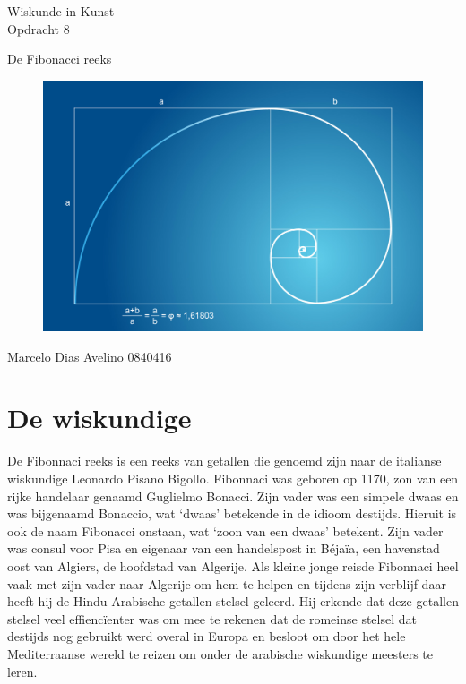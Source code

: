 \documentclass{article}
\begin{document}
\begin{center}
	\huge{Wiskunde in Kunst}\\
	\LARGE{Opdracht }8 \\
	
	\vspace{2cm}
	
	\Large{De Fibonacci reeks}\\
	
	\vfill
	
	\begin{figure}[Hh]
		\centering
		\includegraphics[width=\textwidth]{golden-ratio.jpg}
	\end{figure}
	
	\vfill
	\Large{Marcelo Dias Avelino} \hfill \large{0840416}
\end{center}

\thispagestyle{empty} %

\pagebreak

\setcounter{page}{1} %

\section{De wiskundige}

De Fibonnaci reeks is een reeks van getallen die genoemd zijn naar de italianse wiskundige Leonardo Pisano Bigollo. Fibonnaci was geboren op 1170, zon van een rijke handelaar genaamd Guglielmo Bonacci. Zijn vader was een simpele dwaas en was bijgenaamd Bonaccio, wat `dwaas' betekende in de idioom destijds. Hieruit is ook de naam Fibonacci onstaan, wat `zoon van een dwaas' betekent. Zijn vader was consul voor Pisa en eigenaar van een handelspost in B\'eja\"ia, een havenstad oost van Algiers, de hoofdstad van Algerije. Als kleine jonge reisde Fibonnaci heel vaak met zijn vader naar Algerije om hem te helpen en tijdens zijn verblijf daar heeft hij de Hindu-Arabische getallen stelsel geleerd. Hij erkende dat deze getallen stelsel veel effienc\"ienter was om mee te rekenen dat de romeinse stelsel dat destijds nog gebruikt werd overal in Europa en besloot om door het hele Mediterraanse wereld te reizen om onder de arabische wiskundige meesters te leren.
\end{document}
